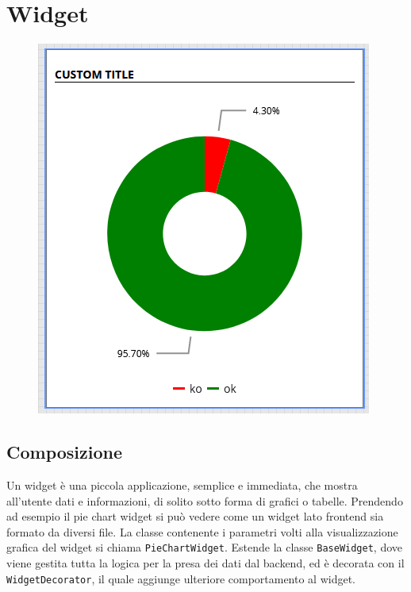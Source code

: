 \chapter{Widget}
\label{chap:widget}
\begin{figure}[h]
\centering
\includegraphics[scale=0.6]{images/widget_example.png}
\end{figure}
\section{Composizione}

Un widget è una piccola applicazione, semplice e immediata, che mostra all'utente dati e informazioni, di solito sotto forma di grafici o tabelle. \newline Prendendo ad esempio il pie chart widget si può vedere come un widget lato frontend sia formato da diversi file. La classe contenente i parametri volti alla visualizzazione grafica del widget si chiama \verb|PieChartWidget|. Estende la classe \verb|BaseWidget|, dove viene gestita tutta la logica per la presa dei dati dal backend, ed è decorata con il \verb|WidgetDecorator|, il quale aggiunge ulteriore comportamento al widget.



